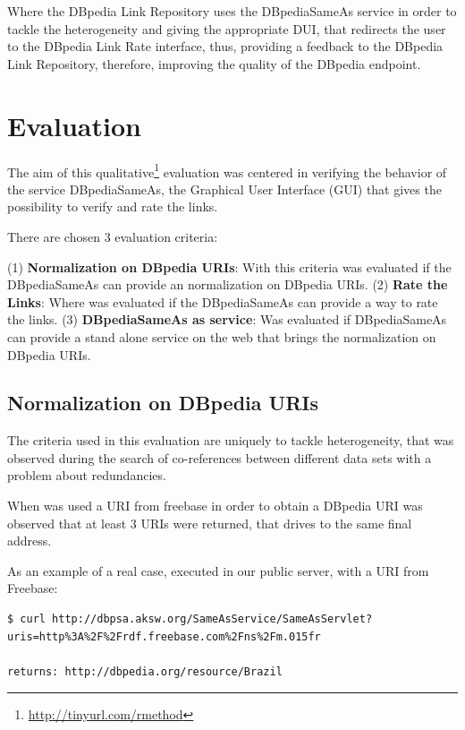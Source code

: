 Where the DBpedia Link Repository uses the DBpediaSameAs service in order to tackle the heterogeneity and giving the appropriate DUI, that redirects the user to the DBpedia Link Rate interface, thus, providing a feedback to the DBpedia Link Repository, therefore, improving the quality of the DBpedia endpoint.

\section{Evaluation}\label{evaluation}

The aim of this qualitative\footnote{\url{http://tinyurl.com/rmethod}} evaluation was centered in verifying the behavior of the service DBpediaSameAs, the Graphical User Interface (GUI) that gives the possibility to verify and rate the links.

There are chosen 3 evaluation criteria:

(1) \textbf{Normalization on DBpedia URIs}: With this criteria was evaluated if the DBpediaSameAs can provide an normalization on DBpedia URIs.
(2) \textbf{Rate the Links}: Where was evaluated if the DBpediaSameAs can provide a way to rate the links.
(3) \textbf{DBpediaSameAs as service}: Was evaluated if DBpediaSameAs can provide a stand alone service on the web that brings the normalization on DBpedia URIs.

\subsection{Normalization on DBpedia URIs}
The criteria used in this evaluation are uniquely to tackle heterogeneity, that was observed during the search of co-references between different data sets with a problem about redundancies.

When was used a URI from freebase in order to obtain a DBpedia URI was observed that at least 3 URIs were returned, that drives to the same final address.

As an example of a real case, executed in our public server, with a URI from Freebase:

\begin{lstlisting}
$ curl http://dbpsa.aksw.org/SameAsService/SameAsServlet?uris=http%3A%2F%2Frdf.freebase.com%2Fns%2Fm.015fr

returns: http://dbpedia.org/resource/Brazil
\end{lstlisting}


